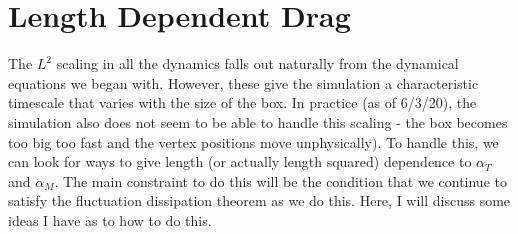 \documentclass[12pt]{article}
\begin{document}
\section{Length Dependent Drag }
The $L^2$ scaling in all the dynamics falls out naturally from the dynamical equations we began with. However, these give the simulation a characteristic timescale that varies with the size of the box. In practice (as of 6/3/20), the simulation also does not seem to be able to handle this scaling - the box becomes too big too fast and the vertex positions move unphysically). To handle this, we can look for ways to give length (or actually length squared) dependence to $\alpha_T$ and $\alpha_M$. The main constraint to do this will be the condition that we continue to satisfy the fluctuation dissipation theorem as we do this. Here, I will discuss some ideas I have as to how to do this.
\end{document}
